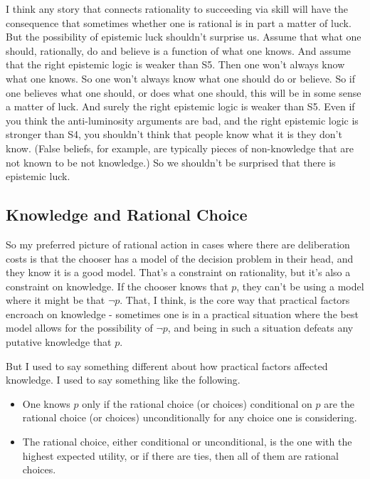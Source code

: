 \documentclass[
  11pt,
  letterpaper,
  DIV=11,
  numbers=noendperiod,
  oneside]{scrartcl}
\providecommand{\tightlist}{%
  \setlength{\itemsep}{0pt}\setlength{\parskip}{0pt}}\usepackage{longtable,booktabs,array}
\begin{document}
I think any story that connects rationality to succeeding via skill will
have the consequence that sometimes whether one is rational is in part a
matter of luck. But the possibility of epistemic luck shouldn't surprise
us. Assume that what one should, rationally, do and believe is a
function of what one knows. And assume that the right epistemic logic is
weaker than S5. Then one won't always know what one knows. So one won't
always know what one should do or believe. So if one believes what one
should, or does what one should, this will be in some sense a matter of
luck. And surely the right epistemic logic is weaker than S5. Even if
you think the anti-luminosity arguments are bad, and the right epistemic
logic is stronger than S4, you shouldn't think that people know what it
is they don't know. (False beliefs, for example, are typically pieces of
non-knowledge that are not known to be not knowledge.) So we shouldn't
be surprised that there is epistemic luck.

\subsection{Knowledge and Rational Choice}\label{knowledge}

So my preferred picture of rational action in cases where there are
deliberation costs is that the chooser has a model of the decision
problem in their head, and they know it is a good model. That's a
constraint on rationality, but it's also a constraint on knowledge. If
the chooser knows that \(p\), they can't be using a model where it might
be that \(\neg p\). That, I think, is the core way that practical
factors encroach on knowledge - sometimes one is in a practical
situation where the best model allows for the possibility of \(\neg p\),
and being in such a situation defeats any putative knowledge that \(p\).

But I used to say something different about how practical factors
affected knowledge. I used to say something like the following.

\begin{itemize}
\tightlist
\item
  One knows \(p\) only if the rational choice (or choices) conditional
  on \(p\) are the rational choice (or choices) unconditionally for any
  choice one is considering.
\item
  The rational choice, either conditional or unconditional, is the one
  with the highest expected utility, or if there are ties, then all of
  them are rational choices.
\end{itemize}
\end{document}
